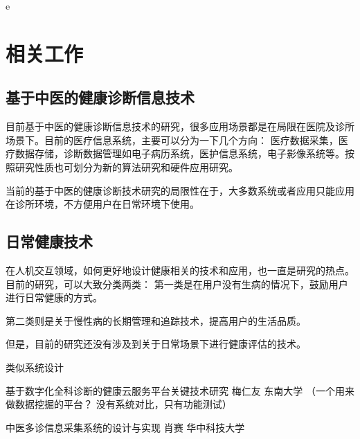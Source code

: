 e\chapter{相关工作}

\section{基于中医的健康诊断信息技术}

目前基于中医的健康诊断信息技术的研究，很多应用场景都是在局限在医院及诊所场景下。目前的医疗信息系统，主要可以分为一下几个方向：
医疗数据采集，医疗数据存储，诊断数据管理如电子病历系统，医护信息系统，电子影像系统等。按照研究性质也可划分为新的算法研究和硬件应用研究。


当前的基于中医的健康诊断技术研究的局限性在于，大多数系统或者应用只能应用在诊所环境，不方便用户在日常环境下使用。

\section{日常健康技术}

在人机交互领域，如何更好地设计健康相关的技术和应用，也一直是研究的热点。目前的研究，可以大致分类两类： 第一类是在用户没有生病的情况下，鼓励用户进行日常健康的方式。

第二类则是关于慢性病的长期管理和追踪技术，提高用户的生活品质。






但是，目前的研究还没有涉及到关于日常场景下进行健康评估的技术。






类似系统设计

基于数字化全科诊断的健康云服务平台关键技术研究 梅仁友 东南大学 （一个用来做数据挖掘的平台？  没有系统对比，只有功能测试）

中医多诊信息采集系统的设计与实现 肖赛 华中科技大学